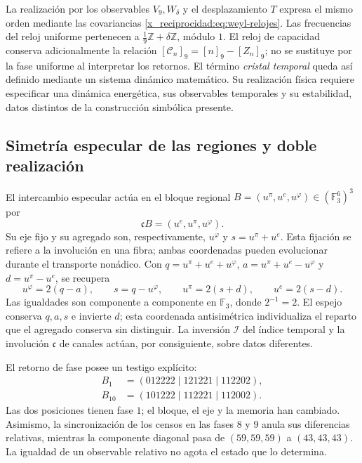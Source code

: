 La realización por los observables \(V_9,W_\delta\) y el desplazamiento
\(T\) expresa el mismo orden mediante las covariancias
\eqref{x_reciprocidad:eq:weyl-relojes}. Las frecuencias del reloj uniforme pertenecen a
\(\frac19\mathbb Z+\delta\mathbb Z\), módulo \(1\). El reloj de
capacidad conserva adicionalmente la relación
\([\mathcal C_n]_9=[n]_9-[Z_n]_9\); no se sustituye por la fase uniforme
al interpretar los retornos. El término \emph{cristal temporal} queda así
definido mediante un sistema dinámico matemático. Su realización física
requiere especificar una dinámica energética, sus observables temporales
y su estabilidad, datos distintos de la construcción simbólica presente.

\subsection{Simetría especular de las regiones y doble realización}
\label{x_reciprocidad:mono-ampl:regiones}

El intercambio especular actúa en el bloque regional
\(B=(u^\pi,u^e,u^\varphi)\in(\mathbb F_3^6)^3\) por
\[
 \mathfrak cB=(u^e,u^\pi,u^\varphi).
\]
Su eje fijo y su agregado son, respectivamente, \(u^\varphi\) y
\(s=u^\pi+u^e\). Esta fijación se refiere a la involución en una fibra;
ambas coordenadas pueden evolucionar durante el transporte nonádico.
Con \(q=u^\pi+u^e+u^\varphi\),
\(a=u^\pi+u^e-u^\varphi\) y \(d=u^\pi-u^e\), se recupera
\[
 u^\varphi=2(q-a),\qquad s=q-u^\varphi,\qquad
 u^\pi=2(s+d),\qquad u^e=2(s-d).
\]
Las igualdades son componente a componente en \(\mathbb F_3\), donde
\(2^{-1}=2\). El espejo conserva \(q,a,s\) e invierte \(d\); esta
coordenada antisimétrica individualiza el reparto que el agregado conserva
sin distinguir. La inversión \(\mathcal I\) del índice temporal y la
involución \(\mathfrak c\) de canales actúan, por consiguiente, sobre
datos diferentes.

El retorno de fase posee un testigo explícito:
\[
 \begin{aligned}
 B_1&=(012222\mid121221\mid112202),\\
 B_{10}&=(101222\mid112221\mid112002).
 \end{aligned}
\]
Las dos posiciones tienen fase \(1\); el bloque, el eje y la memoria han
cambiado. Asimismo, la sincronización de los censos en las fases \(8\) y
\(9\) anula sus diferencias relativas, mientras la componente diagonal
pasa de \((59,59,59)\) a \((43,43,43)\). La igualdad de un observable
relativo no agota el estado que lo determina.

